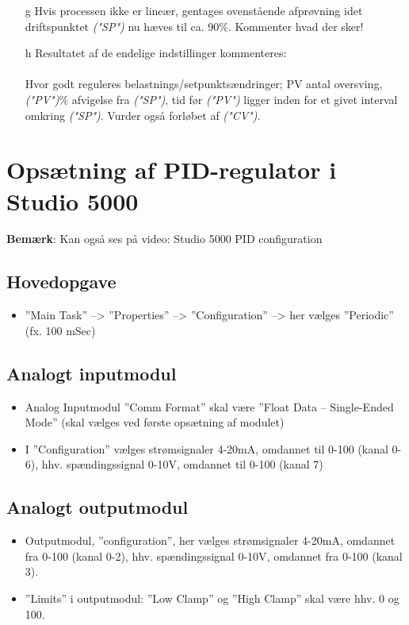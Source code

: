 \documentclass[12pt,a4paper]{article}
\begin{document}
	\begin{itemize}
		\item[g] Hvis processen ikke er lineær, gentages ovenstående afprøvning idet driftspunktet \textit{("SP")} nu hæves til ca. 90\%.
		Kommenter hvad der sker!
		
		\item[h] Resultatet af de endelige indstillinger kommenteres:
		\\\\
		Hvor godt reguleres belastnings/setpunktsændringer; PV antal oversving, \textit{("PV")}\% afvigelse fra \textit{("SP")}, tid før \textit{("PV")} ligger inden for et givet interval omkring \textit{("SP")}.
		Vurder også forløbet af \textit{("CV")}.
	\end{itemize}
	
	\clearpage
	
	\section{Opsætning af PID-regulator i Studio 5000}
	
	\textbf{Bemærk}: Kan også ses på video: Studio 5000 PID configuration
	
	\subsection*{Hovedopgave}
	\begin{itemize}
		\item ”Main Task” –> ”Properties” –> ”Configuration” –> her vælges ”Periodic” (fx. 100 mSec)
	\end{itemize}
	
	\subsection*{Analogt inputmodul}
	\begin{itemize}
		\item Analog Inputmodul ”Comm Format” skal være ”Float Data – Single-Ended Mode” (skal vælges ved første opsætning af modulet)
		\item I ”Configuration” vælges strømsignaler 4-20mA, omdannet til 0-100 (kanal 0-6), hhv. spændingssignal 0-10V, omdannet til 0-100 (kanal 7)
	\end{itemize}
	
	\subsection*{Analogt outputmodul}
	\begin{itemize}
		\item Outputmodul, ”configuration”, her vælges strømsignaler 4-20mA, omdannet fra 0-100 (kanal 0-2), hhv. spændingssignal 0-10V, omdannet fra 0-100 (kanal 3).
		\item ”Limits” i outputmodul: ”Low Clamp” og ”High Clamp” skal være hhv. 0 og 100.
	\end{itemize}
	
\end{document}
